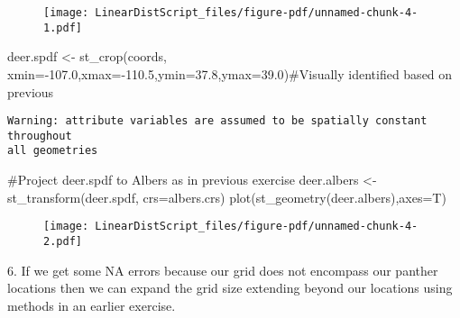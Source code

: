 \documentclass[
  letterpaper,
]{book}
\newenvironment{Shaded}{\begin{snugshade}}{\end{snugshade}}
\newcommand{\AttributeTok}[1]{\textcolor[rgb]{0.40,0.45,0.13}{#1}}
\newcommand{\CommentTok}[1]{\textcolor[rgb]{0.37,0.37,0.37}{#1}}
\newcommand{\FloatTok}[1]{\textcolor[rgb]{0.68,0.00,0.00}{#1}}
\newcommand{\FunctionTok}[1]{\textcolor[rgb]{0.28,0.35,0.67}{#1}}
\newcommand{\NormalTok}[1]{\textcolor[rgb]{0.00,0.23,0.31}{#1}}
\newcommand{\OtherTok}[1]{\textcolor[rgb]{0.00,0.23,0.31}{#1}}
\newcommand{\SpecialCharTok}[1]{\textcolor[rgb]{0.37,0.37,0.37}{#1}}
\begin{document}
\begin{figure}[H]

{\centering \texttt{[image: LinearDistScript\_files/figure-pdf/unnamed-chunk-4-1.pdf]}

}

\end{figure}

\begin{Shaded}
\begin{Highlighting}[]
\NormalTok{deer.spdf }\OtherTok{\textless{}{-}} \FunctionTok{st\_crop}\NormalTok{(coords, }\AttributeTok{xmin=}\SpecialCharTok{{-}}\FloatTok{107.0}\NormalTok{,}\AttributeTok{xmax=}\SpecialCharTok{{-}}\FloatTok{110.5}\NormalTok{,}\AttributeTok{ymin=}\FloatTok{37.8}\NormalTok{,}\AttributeTok{ymax=}\FloatTok{39.0}\NormalTok{)}\CommentTok{\#Visually identified based on previous }
\end{Highlighting}
\end{Shaded}

\begin{verbatim}
Warning: attribute variables are assumed to be spatially constant throughout
all geometries
\end{verbatim}

\begin{Shaded}
\begin{Highlighting}[]
\CommentTok{\#Project deer.spdf to Albers as in previous exercise}
\NormalTok{deer.albers }\OtherTok{\textless{}{-}}\FunctionTok{st\_transform}\NormalTok{(deer.spdf, }\AttributeTok{crs=}\NormalTok{albers.crs)}
\FunctionTok{plot}\NormalTok{(}\FunctionTok{st\_geometry}\NormalTok{(deer.albers),}\AttributeTok{axes=}\NormalTok{T)}
\end{Highlighting}
\end{Shaded}

\begin{figure}[H]

{\centering \texttt{[image: LinearDistScript\_files/figure-pdf/unnamed-chunk-4-2.pdf]}

}

\end{figure}

6. If we get some NA errors because our grid does not encompass our
panther locations then we can expand the grid size extending beyond our
locations using methods in an earlier exercise.
\end{document}
